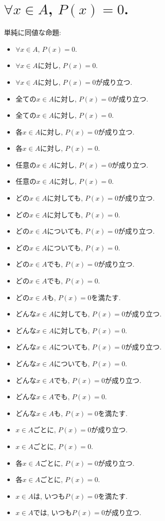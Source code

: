 \documentclass[a4paper,12pt,draft]{amsart}
\begin{document}
\section{$\forall x \in A$, $P(x)=0$.}
単純に同値な命題:
\begin{itemize}
\item $\forall x \in A$, $P(x)=0$.
\item $\forall x \in A$に対し, $P(x)=0$.
\item $\forall x \in A$に対し, $P(x)=0$が成り立つ.
\item 全ての$x\in A$に対し, $P(x)=0$が成り立つ.
\item 全ての$x\in A$に対し, $P(x)=0$.
\item 各$x\in A$に対し, $P(x)=0$が成り立つ.
\item 各$x\in A$に対し, $P(x)=0$.
\item 任意の$x\in A$に対し, $P(x)=0$が成り立つ.
\item 任意の$x\in A$に対し, $P(x)=0$.
\item どの$x\in A$に対しても, $P(x)=0$が成り立つ.
\item どの$x\in A$に対しても, $P(x)=0$.
\item どの$x\in A$についても, $P(x)=0$が成り立つ.
\item どの$x\in A$についても, $P(x)=0$.
\item どの$x\in A$でも, $P(x)=0$が成り立つ.
\item どの$x\in A$でも, $P(x)=0$.
\item どの$x\in A$も, $P(x)=0$を満たす.
\item どんな$x\in A$に対しても, $P(x)=0$が成り立つ.
\item どんな$x\in A$に対しても, $P(x)=0$.
\item どんな$x\in A$についても, $P(x)=0$が成り立つ.
\item どんな$x\in A$についても, $P(x)=0$.
\item どんな$x\in A$でも, $P(x)=0$が成り立つ.
\item どんな$x\in A$でも, $P(x)=0$.
\item どんな$x\in A$も, $P(x)=0$を満たす.
\item $x\in A$ごとに, $P(x)=0$が成り立つ.
\item $x\in A$ごとに, $P(x)=0$.
\item 各$x\in A$ごとに, $P(x)=0$が成り立つ.
\item 各$x\in A$ごとに, $P(x)=0$.
\item $x\in A$は, いつも$P(x)=0$を満たす.
\item $x\in A$では, いつも$P(x)=0$が成り立つ.

\end{itemize}
\end{document}
